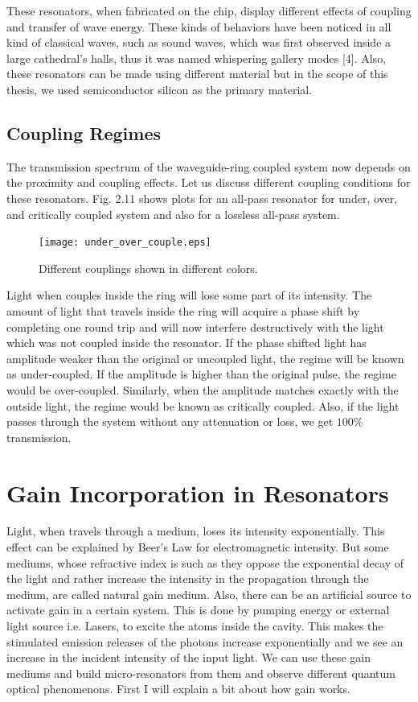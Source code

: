 These resonators, when fabricated on the chip, display different effects of coupling and transfer of wave energy. These kinds of behaviors have been noticed in all kind of classical waves, such as sound waves, which was first observed inside a large cathedral's halls, thus it was named whispering gallery modes [4]. Also, these resonators can be made using different material but in the scope of this thesis, we used semiconductor silicon as the primary material. 


\subsection{Coupling Regimes}

The transmission spectrum of the waveguide-ring coupled system now depends on the proximity and coupling effects. Let us discuss different coupling conditions for these resonators. Fig. 2.11 shows plots for an all-pass resonator for under, over, and critically coupled system and also for a lossless all-pass system.

\begin{figure}[h]
\centering
\texttt{[image: under\_over\_couple.eps]}
\caption{Different couplings shown in different colors.}
\end{figure}

Light when couples inside the ring will lose some part of its intensity. The amount of light that travels inside the ring will acquire a phase shift by completing one round trip and will now interfere destructively with the light which was not coupled inside the resonator. If the phase shifted light has amplitude weaker than the original or uncoupled light, the regime will be known as under-coupled. If the amplitude is higher than the original pulse, the regime would be over-coupled. Similarly, when the amplitude matches exactly with the outside light, the regime would be known as critically coupled. Also, if the light passes through the system without any attenuation or loss, we get $100\%$ transmission.


\section{Gain Incorporation in Resonators}
Light, when travels through a medium, loses its intensity exponentially. This effect can be explained by Beer's Law for electromagnetic intensity. But some mediums, whose refractive index is such as they oppose the exponential decay of the light and rather increase the intensity in the propagation through the medium, are called natural gain medium. Also, there can be an artificial source to activate gain in a certain system. This is done by pumping energy or external light source i.e. Lasers, to excite the atoms inside the cavity. This makes the stimulated emission releases of the photons increase exponentially and we see an increase in the incident intensity of the input light. We can use these gain mediums and build micro-resonators from them and observe different quantum optical phenomenons. First I will explain a bit about how gain works.


